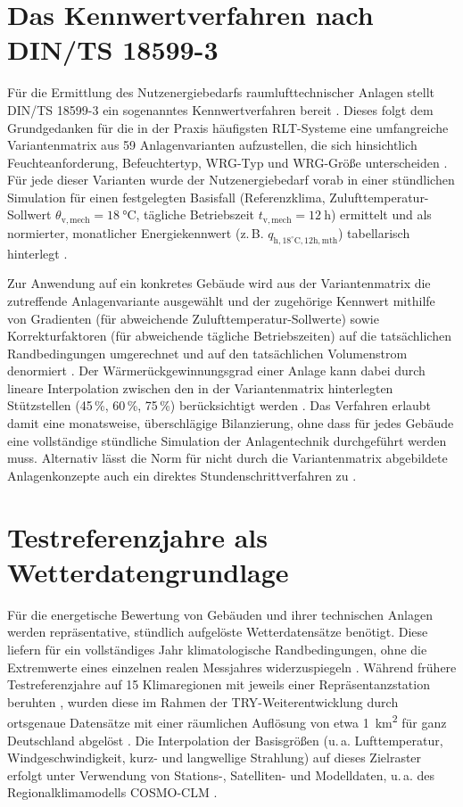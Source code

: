 \documentclass{scrreprt}
\begin{document}
\section{Das Kennwertverfahren nach DIN/TS 18599-3}
Für die Ermittlung des Nutzenergiebedarfs raumlufttechnischer Anlagen
stellt DIN/TS 18599-3 ein sogenanntes Kennwertverfahren bereit
\parencite{DIN185993}. Dieses folgt dem Grundgedanken für die in der Praxis häufigsten \ac{RLT}-Systeme eine umfangreiche Variantenmatrix aus 59 Anlagenvarianten aufzustellen, die
sich hinsichtlich Feuchteanforderung, Befeuchtertyp,
\ac{WRG}-Typ und \ac{WRG}-Größe unterscheiden \parencite{DIN185993}.
Für jede dieser Varianten wurde der Nutzenergiebedarf vorab in einer
stündlichen Simulation für einen festgelegten Basisfall (Referenzklima,
Zulufttemperatur-Sollwert $\theta_{\mathrm{v,mech}}=\SI{18}{\celsius}$,
tägliche Betriebszeit $t_{\mathrm{v,mech}}=\SI{12}{\hour}$) ermittelt und
als normierter, monatlicher Energiekennwert (z.\,B.
$q_{\mathrm{h,18^\circ C,12h,mth}}$) tabellarisch hinterlegt
\parencite{DIN185993}.

Zur Anwendung auf ein konkretes Gebäude wird aus der Variantenmatrix
die zutreffende Anlagenvariante ausgewählt und der zugehörige
Kennwert mithilfe von Gradienten (für abweichende
Zulufttemperatur-Sollwerte) sowie Korrekturfaktoren (für abweichende
tägliche Betriebszeiten) auf die tatsächlichen Randbedingungen
umgerechnet und auf den tatsächlichen Volumenstrom denormiert
\parencite{DIN185993}. Der Wärmerückgewinnungsgrad einer Anlage kann
dabei durch lineare Interpolation zwischen den in der Variantenmatrix
hinterlegten Stützstellen (45\,\%, 60\,\%, 75\,\%) berücksichtigt
werden \parencite{DIN185993}. Das Verfahren erlaubt damit eine
monatsweise, überschlägige Bilanzierung, ohne dass für jedes Gebäude
eine vollständige stündliche Simulation der Anlagentechnik
durchgeführt werden muss. Alternativ lässt die Norm für nicht durch
die Variantenmatrix abgebildete Anlagenkonzepte auch ein direktes
Stundenschrittverfahren zu \parencite{DIN185993}.

\section{Testreferenzjahre als Wetterdatengrundlage}
Für die energetische Bewertung von Gebäuden und ihrer technischen
Anlagen werden repräsentative, stündlich aufgelöste Wetterdatensätze
benötigt. Diese liefern für ein vollständiges Jahr klimatologische Randbedingungen, ohne die
Extremwerte eines einzelnen realen Messjahres widerzuspiegeln
\parencite{DWDBBR2017}. Während frühere Testreferenzjahre auf 15
Klimaregionen mit jeweils einer Repräsentanzstation beruhten
\parencite[vgl.][]{DIN1859910}, wurden diese im Rahmen der
TRY-Weiterentwicklung durch ortsgenaue Datensätze mit einer
räumlichen Auflösung von etwa \SI{1}{\square\kilo\meter} für ganz
Deutschland abgelöst \parencite{Spekat2011,DWDBBR2017}. Die
Interpolation der Basisgrößen (u.\,a. Lufttemperatur,
Windgeschwindigkeit, kurz- und langwellige Strahlung) auf dieses
Zielraster erfolgt unter Verwendung von Stations-, Satelliten- und
Modelldaten, u.\,a. des Regionalklimamodells COSMO-CLM
\parencite{Krähenmann2016,DWDBBR2017}.
\end{document}
